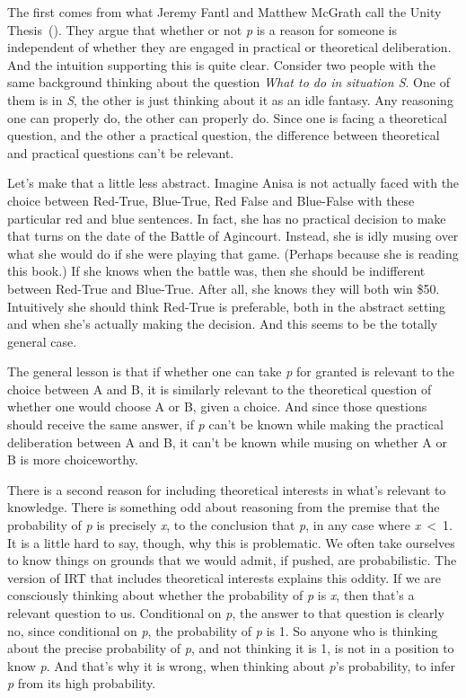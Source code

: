 \documentclass[
  12pt,
  letterpaper,
]{scrbook}
\begin{document}
The first comes from what Jeremy Fantl and Matthew McGrath call the
Unity Thesis~(). They argue that whether or not \emph{p} is a reason for
someone is independent of whether they are engaged in practical or
theoretical deliberation. And the intuition supporting this is quite
clear. Consider two people with the same background thinking about the
question \emph{What to do in situation S}. One of them is in \emph{S},
the other is just thinking about it as an idle fantasy. Any reasoning
one can properly do, the other can properly do. Since one is facing a
theoretical question, and the other a practical question, the difference
between theoretical and practical questions can't be relevant.

Let's make that a little less abstract. Imagine Anisa is not actually
faced with the choice between Red-True, Blue-True, Red False and
Blue-False with these particular red and blue sentences. In fact, she
has no practical decision to make that turns on the date of the Battle
of Agincourt. Instead, she is idly musing over what she would do if she
were playing that game. (Perhaps because she is reading this book.) If
she knows when the battle was, then she should be indifferent between
Red-True and Blue-True. After all, she knows they will both win \$50.
Intuitively she should think Red-True is preferable, both in the
abstract setting and when she's actually making the decision. And this
seems to be the totally general case.

The general lesson is that if whether one can take \emph{p} for granted
is relevant to the choice between A and B, it is similarly relevant to
the theoretical question of whether one would choose A or B, given a
choice. And since those questions should receive the same answer, if
\emph{p} can't be known while making the practical deliberation between
A and B, it can't be known while musing on whether A or B is more
choiceworthy.

There is a second reason for including theoretical interests in what's
relevant to knowledge. There is something odd about reasoning from the
premise that the probability of \emph{p} is precisely \emph{x}, to the
conclusion that \emph{p}, in any case where \emph{x}~\textless~1. It is
a little hard to say, though, why this is problematic. We often take
ourselves to know things on grounds that we would admit, if pushed, are
probabilistic. The version of IRT that includes theoretical interests
explains this oddity. If we are consciously thinking about whether the
probability of \emph{p} is \emph{x}, then that's a relevant question to
us. Conditional on \emph{p}, the answer to that question is clearly no,
since conditional on \emph{p}, the probability of \emph{p} is 1. So
anyone who is thinking about the precise probability of \emph{p}, and
not thinking it is 1, is not in a position to know \emph{p}. And that's
why it is wrong, when thinking about \emph{p}'s probability, to infer
\emph{p} from its high probability.
\end{document}
